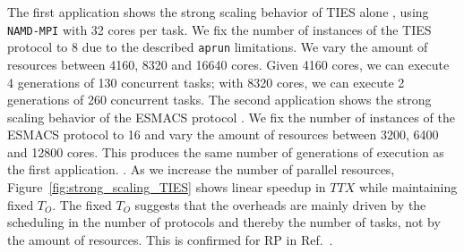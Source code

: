 The first application  shows the strong scaling behavior of
TIES alone , using \texttt{NAMD-MPI} with 32
cores per task. We fix the number of instances of the TIES protocol to 8 due
to the described \texttt{aprun} limitations. We vary the amount of resources
between 4160, 8320 and 16640 cores. Given 4160 cores, we can execute 4
generations of 130 concurrent tasks; with 8320 cores, we can execute 2
generations of 260 concurrent tasks. The second application shows the strong
scaling behavior of the ESMACS protocol . We fix the number of instances of the ESMACS
protocol to 16 and vary the amount of resources between 3200, 6400 and 12800
cores. This produces the same number of generations of execution  as the first
application. . As we increase the number of parallel resources,
Figure~\ref{fig:strong_scaling_TIES} shows linear speedup in \(TTX\) while
maintaining fixed $T_{O}$. The fixed $T_{O}$ suggests that the overheads are
mainly driven by the scheduling in the number of protocols and thereby the
number of tasks, not by the amount of resources. This is confirmed for RP in
Ref.~\cite{merzky2018}.




